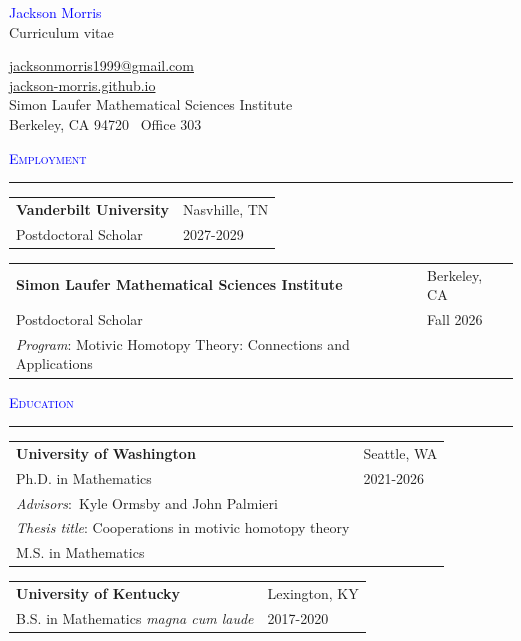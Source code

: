 \documentclass[10pt]{article}
\newcommand{\grey}[1]{\textcolor{cvgrey}{#1}}
\newcommand{\myarray}[1]{
    \begin{tabular}{>{\raggedright\arraybackslash}p{11.5cm} >{\raggedleft\arraybackslash}p{5.33cm}}
    #1
    \end{tabular}
}
\newenvironment{rSection}[1]{ %
  \medskip
  {\large\scshape\textcolor{Blue}{#1}} %
  \smallskip
  \hrule %
  \begin{list}{}{ %
    \setlength{\leftmargin}{0em} %
  }
  \item[]
}{
  \end{list}
}
\begin{document}
\flushleft
\parindent=0pt 
\begin{minipage}[b]{0.45\textwidth}
    \raggedright
    {\fontsize{26}{30}\selectfont\textcolor{Blue}{Jackson Morris}}\\[2mm]
    {\large\grey{Curriculum vitae}}
\end{minipage}%
\hfill
\begin{minipage}[b]{0.53\textwidth}
    \raggedleft
    \textcolor{Blue}{\href{mailto:jacksonmorris1999@gmail.com}{jacksonmorris1999@gmail.com}}\\
    \textcolor{purple!90!black}{\url{jackson-morris.github.io}}\\
    Simon Laufer Mathematical Sciences Institute\\
    Berkeley, CA 94720 \textbar \ Office 303
\end{minipage}
\vspace{3mm}

\begin{rSection}{Employment}
\myarray{
    \textbf{Vanderbilt University} & \footnotesize Nasvhille, TN\\
    Postdoctoral Scholar & \footnotesize \grey{2027-2029}
}

\myarray{
    \textbf{Simon Laufer Mathematical Sciences Institute} & \footnotesize Berkeley, CA \\
    Postdoctoral Scholar & \footnotesize \grey{Fall 2026}\\
    \grey{\emph{Program}: Motivic Homotopy Theory: Connections and Applications}
}
\end{rSection}

\begin{rSection}{Education}
\myarray{
    \textbf{University of Washington} & \footnotesize {Seattle, WA}\\
    Ph.D. in Mathematics & \footnotesize \grey{2021-2026} \\
    \grey{\emph{Advisors}:\ Kyle Ormsby and John Palmieri}\\
    \grey{\emph{Thesis title}: Cooperations in motivic homotopy theory}\\
    M.S. in Mathematics 
}

\myarray{
    \textbf{University of Kentucky} & \footnotesize {Lexington, KY}\\
    B.S. in Mathematics \textit{magna cum laude}  &     \footnotesize \grey{2017-2020}\\
}
\end{rSection}
\end{document}
